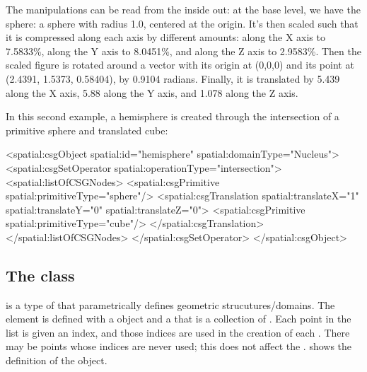 The manipulations can be read from the inside out: at the base level, we have the \CSGPrimitive sphere: a sphere with radius 1.0, centered at the origin.  It's then scaled such that it is compressed along each axis by different amounts: along the X axis to 7.5833\%, along the Y axis to 8.0451\%, and along the Z axis to 2.9583\%.  Then the scaled figure is rotated around a vector with its origin at (0,0,0) and its point at (2.4391, 1.5373, 0.58404), by 0.9104 radians.  Finally, it is translated by 5.439 along the X axis, 5.88 along the Y axis, and 1.078 along the Z axis.

In this second example, a hemisphere is created through the intersection of a primitive sphere and translated cube:

\begin{example}
  <spatial:csgObject spatial:id="hemisphere" spatial:domainType="Nucleus">
    <spatial:csgSetOperator spatial:operationType="intersection">
      <spatial:listOfCSGNodes>
        <spatial:csgPrimitive spatial:primitiveType="sphere"/>
        <spatial:csgTranslation spatial:translateX="1" spatial:translateY="0"
                                spatial:translateZ="0">
          <spatial:csgPrimitive spatial:primitiveType="cube"/>
        </spatial:csgTranslation>
      </spatial:listOfCSGNodes>
    </spatial:csgSetOperator>
  </spatial:csgObject>
\end{example}


\subsection{The  class}
\label{parametricgeometry-class}
\label{listofparametricobjects-class}
\ParametricGeometry is a type of \GeometryDefinition that parametrically defines geometric strucutures/domains. The \ParametricGeometry element is defined with a \SpatialPoints object and a  that is a collection of \ParametricObjects. Each point in the \SpatialPoints list is given an index, and those indices are used in the creation of each \ParametricObject.  There may be points whose indices are never used; this does not affect the \ParametricGeometry.   shows the definition of the \ParametricGeometry object.

